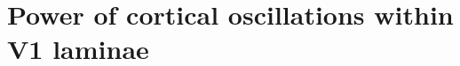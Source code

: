 \chapter{Power of cortical oscillations within V1 laminae}
\label{ch:lam}

\graphicspath{{Chapters/laminar-chapter/}}

